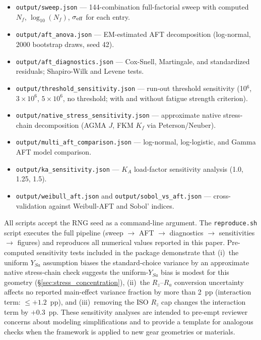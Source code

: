 \documentclass[twocolumn,12pt,a4paper]{article}
\begin{document}
\begin{itemize}
  \item \texttt{output/sweep.json} — 144-combination full-factorial
        sweep with computed $N_f$, $\log_{10}(N_f)$, $\sigma_{\rm
        eff}$ for each entry.
  \item \texttt{output/aft\_anova.json} — EM-estimated AFT
        decomposition (log-normal, 2000 bootstrap draws, seed 42).
  \item \texttt{output/aft\_diagnostics.json} — Cox-Snell, Martingale,
        and standardized residuals; Shapiro-Wilk and Levene tests.
  \item \texttt{output/\allowbreak threshold\_sensitivity\allowbreak .json} — run-out
        threshold sensitivity (10$^6$, $3\times10^6$, $5\times10^6$,
        no threshold; with and without fatigue strength criterion).
  \item \texttt{output/\allowbreak native\_stress\_sensitivity\allowbreak .json} —
        approximate native stress-chain decomposition (AGMA $J$,
        FKM $K_f$ via Peterson/Neuber).
  \item \texttt{output/multi\_aft\_comparison.json} — log-normal,
        log-logistic, and Gamma AFT model comparison.
  \item \texttt{output/ka\_sensitivity.json} — $K_A$ load-factor
        sensitivity analysis (1.0, 1.25, 1.5).
  \item \texttt{output/weibull\_aft.json} and
        \texttt{output/sobol\_vs\_aft.json} — cross-validation
        against Weibull-AFT and Sobol' indices.
\end{itemize}

All scripts accept the RNG seed as a command-line argument. The
\texttt{reproduce.sh} script executes the full pipeline
(sweep $\rightarrow$ AFT $\rightarrow$ diagnostics $\rightarrow$
sensitivities $\rightarrow$ figures) and reproduces all numerical
values reported in this paper. Pre-computed
sensitivity tests included in the package demonstrate that (i)~the
uniform $Y_{Sa}$ assumption biases the standard-choice variance by
an approximate native stress-chain check suggests the uniform-$Y_{Sa}$
bias is modest for this geometry (\S\ref{sec:stress_concentration}), (ii)~the
$R_z$--$R_a$ conversion uncertainty affects no reported main-effect
variance fraction by more than 2~pp (interaction term: $\leq +1.2$~pp), and (iii)~removing the ISO $R_z$ cap
changes the interaction term by $+0.3$~pp. These sensitivity analyses
are intended to pre-empt reviewer concerns about modeling
simplifications and to provide a template for analogous checks when
the framework is applied to new gear geometries or materials.
\end{document}
